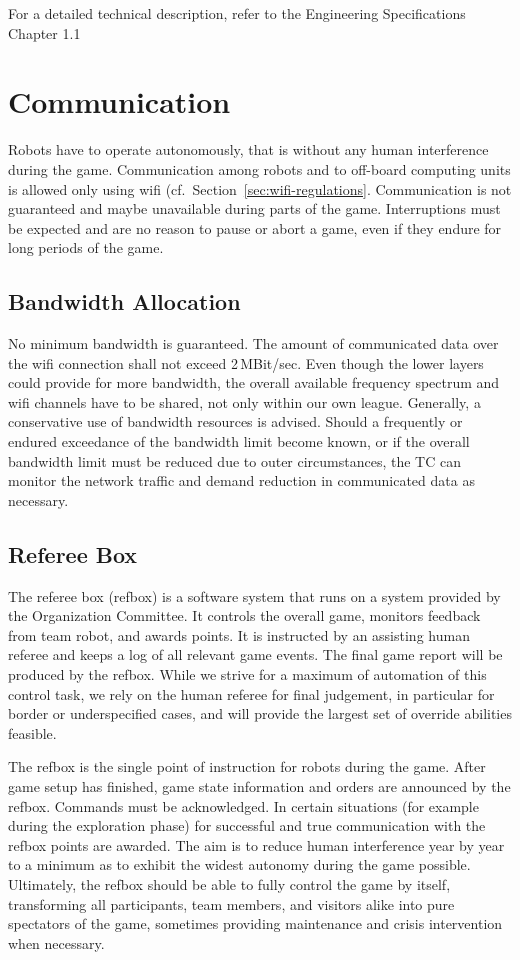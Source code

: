 \documentclass[12pt,twoside]{article}
\newcommand{\refsec}[1]{Section~\ref{#1}}
\begin{document}
For a detailed technical description, refer to the Engineering
Specifications Chapter 1.1 

\section{Communication}
Robots have to operate autonomously, that is without any human
interference during the game. Communication among robots and to
off-board computing units is allowed only using wifi
(cf.~\refsec{sec:wifi-regulations}. Communication is not guaranteed
and maybe unavailable during parts of the game. Interruptions must be
expected and are no reason to pause or abort a game, even if they
endure for long periods of the game.

\subsection{Bandwidth Allocation}
\label{sec:bandwidth}
No minimum bandwidth is guaranteed. The amount of communicated data
over the wifi connection shall not exceed 2\,MBit/sec. Even though the
lower layers could provide for more bandwidth, the overall available
frequency spectrum and wifi channels have to be shared, not only
within our own league. Generally, a conservative use of bandwidth
resources is advised. Should a frequently or endured exceedance of the
bandwidth limit become known, or if the overall bandwidth limit must
be reduced due to outer circumstances, the TC can monitor the network
traffic and demand reduction in communicated data as necessary.

\subsection{Referee Box}
\label{sec:refbox}
The referee box (refbox) is a software system that runs on a system
provided by the Organization Committee. It controls the overall game,
monitors feedback from team robot, and awards points. It is instructed
by an assisting human referee and keeps a log of all relevant game
events. The final game report will be produced by the refbox. While we
strive for a maximum of automation of this control task, we rely on
the human referee for final judgement, in particular for border or
underspecified cases, and will provide the largest set of override
abilities feasible.

The refbox is the single point of instruction for robots during the
game. After game setup has finished, game state information and orders
are announced by the refbox. Commands must be acknowledged. In certain
situations (for example during the exploration phase) for successful
and true communication with the refbox points are awarded. The aim is
to reduce human interference year by year to a minimum as to exhibit
the widest autonomy during the game possible. Ultimately, the refbox
should be able to fully control the game by itself, transforming all
participants, team members, and visitors alike into pure spectators of
the game, sometimes providing maintenance and crisis intervention when
necessary.
\end{document}
